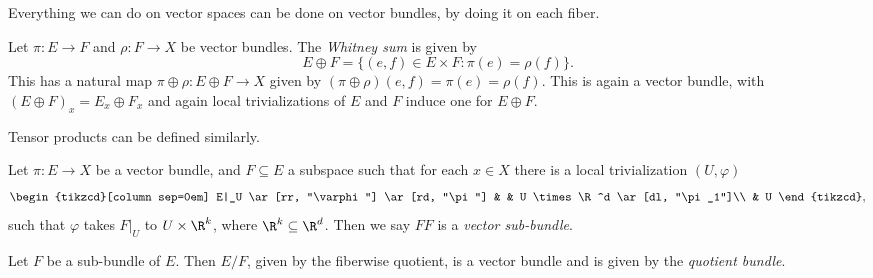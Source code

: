 \documentclass[a4paper]{article}
\begin{document}
Everything we can do on vector spaces can be done on vector bundles, by doing it on each fiber.
\begin{defi}
  Let $\pi: E \to F$ and $\rho: F \to X$ be vector bundles. The \emph{Whitney sum} is given by
  \[
    E \oplus F = \{(e, f)\in E \times F: \pi(e) = \rho(f)\}.
  \]
  This has a natural map $\pi \oplus \rho: E \oplus F \to X$ given by $(\pi \oplus \rho)(e, f) = \pi(e) = \rho(f)$. This is again a vector bundle, with $(E \oplus F)_x = E_x \oplus F_x$ and again local trivializations of $E$ and $F$ induce one for $E \oplus F$.
\end{defi}

Tensor products can be defined similarly.

\begin{defi}
  Let $\pi: E \to X$ be a vector bundle, and $F \subseteq E$ a subspace such that for each $x \in X$ there is a local trivialization $(U, \varphi)$
  \[
    \begin{tikzcd}[column sep=0em]
      E|_U \ar[rr, "\varphi"] \ar[rd, "\pi"] & & U \times \R^d \ar[dl, "\pi_1"]\\
      & U
    \end{tikzcd},
  \]
  such that $\varphi$ takes $F|_U$ to $U \times \R^k$, where $\R^k \subseteq \R^d$. Then we say $FF$ is a \emph{vector sub-bundle}.
\end{defi}

\begin{defi}
  Let $F$ be a sub-bundle of $E$. Then $E/F$, given by the fiberwise quotient, is a vector bundle and is given by the \emph{quotient bundle}.
\end{defi}
\end{document}
